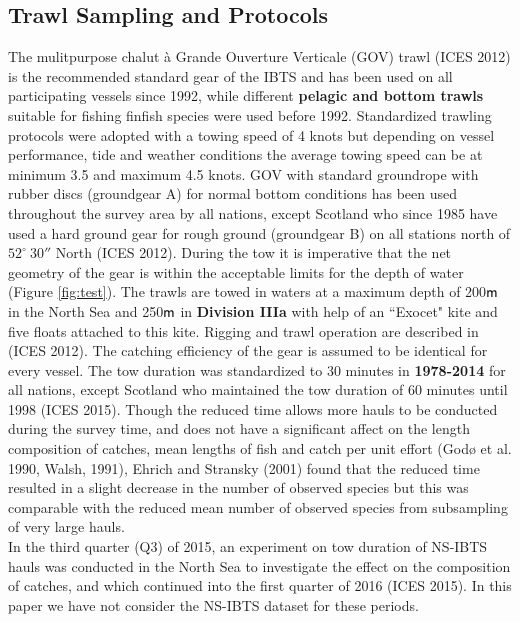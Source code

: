 \documentclass[a4paper 12pt]{article}
\numberwithin{equation}{section}
\newcommand{\m}{\textnormal{\sffamily m}\xspace}
\begin{document}
\subsection{Trawl Sampling and Protocols}
\label{trawlproto}
The mulitpurpose chalut {\`a} Grande Ouverture Verticale (GOV) trawl (ICES 2012) is the recommended standard gear of the IBTS and has been used on all participating vessels since 1992, while different {\bf pelagic and bottom trawls} suitable for fishing finfish species were used before 1992. Standardized trawling protocols were adopted with a towing speed of 4 knots but depending on vessel performance, tide and weather conditions the average towing speed can be at minimum 3.5 and maximum 4.5 knots. GOV with standard groundrope with rubber discs (groundgear A) for normal bottom conditions has been used throughout the survey area by all nations, except Scotland who since 1985 have used a hard ground gear for rough ground (groundgear B) on all stations north of   $52^\circ  \ 30''$ North  (ICES 2012). During the tow it is imperative that the net geometry of the gear is within the acceptable limits for the depth of water (Figure \ref{fig:test}). The trawls are towed in waters at a maximum depth of 200$\m$ in the North Sea and 250$\m$ in {\bf Division IIIa} with help of an ``Exocet"  kite and five floats attached to this kite. Rigging and trawl operation are described in (ICES 2012). The catching efficiency of the gear is assumed to be identical for every vessel. The tow duration was standardized to 30 minutes in {\bf 1978-2014} for all nations, except Scotland who maintained the tow duration of 60 minutes until 1998 (ICES 2015). Though the reduced time allows more hauls to be conducted during the survey time, and does not have a significant affect  on the length composition of catches, mean lengths of fish and catch per unit effort (God$ø$ et al. 1990, Walsh, 1991), Ehrich and Stransky (2001) found that the reduced time resulted in a slight decrease in the number of observed species but this was comparable with the reduced mean number of observed species from subsampling of very large hauls.\\
\indent  In the third quarter (Q3) of 2015, an experiment on tow duration of NS-IBTS hauls was conducted in the North Sea to investigate the effect on the composition of catches, and which continued into the first quarter of 2016 (ICES 2015). In this paper we have not consider the NS-IBTS dataset for these periods.\\
\end{document}
